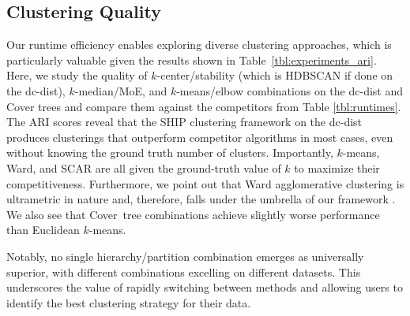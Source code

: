 \subsection{Clustering Quality}\label{sec:exp:high_quality_benchmarks}



Our runtime efficiency enables exploring diverse clustering approaches, which is particularly valuable given the results shown in Table~\ref{tbl:experiments_ari}. Here, we study the quality of $k$-center/stability (which is HDBSCAN if done on the dc-dist), $k$-median/MoE, and $k$-means/elbow combinations on the dc-dist and Cover trees and compare them against the competitors from Table \ref{tbl:runtimes}. The ARI scores reveal that the SHIP clustering framework on the dc-dist produces clusterings that outperform competitor algorithms in most cases, even without knowing the ground truth number of clusters. Importantly, $k$-means, Ward, and SCAR are all given the ground-truth value of $k$ to maximize their competitiveness. Furthermore, we point out that Ward agglomerative clustering is ultrametric in nature and, therefore, falls under the umbrella of our framework \citep{ultrametric_single_linkage}.
We also see that Cover~tree combinations achieve slightly worse performance than Euclidean $k$-means.

Notably, no single hierarchy/partition combination emerges as universally superior, with different combinations excelling on different datasets. This underscores the value of rapidly switching between methods and allowing users to identify the best clustering strategy for their data.